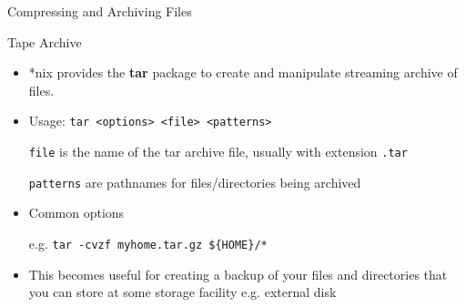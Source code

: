 \documentclass[slidestop,mathserif,compress,xcolor=svgnames]{beamer}
\newenvironment{bblock}[0]
{
\begin{beamerboxesrounded}[upper=uppercol1,lower=lowercol1,shadow=true]}
{\end{beamerboxesrounded}}
\begin{document}
\begin{frame}[allowframebreaks]{\small Compressing and Archiving Files}
  \begin{bblock}{Tape Archive}
    \begin{itemize}
      \item *nix provides the \textbf{tar} package to create and manipulate streaming archive of files.
      \item Usage: \texttt{tar <options> <file> <patterns>}
      \item[] \texttt{file} is the name of the tar archive file, usually with extension \texttt{.tar}
      \item[] \texttt{patterns} are pathnames for files/directories being archived
      \item Common options
      \item[e.g.] \texttt{tar -cvzf myhome.tar.gz \$\{HOME\}/*}
      \item This becomes useful for creating a backup of your files and directories that you can store at some storage facility e.g. external disk
    \end{itemize}
  \end{bblock}
\end{frame}
\end{document}
